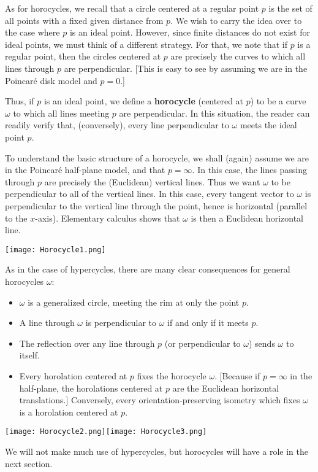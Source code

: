 \documentclass[leqno]{book}
\begin{document}
As for horocycles, we recall that a circle centered at a regular point $p$ is the set of all points with a fixed given distance from $p$.  We wish to carry the idea over to the case where $p$ is an ideal point.  However, since finite distances do not exist for ideal points, we must think of a different strategy.  For that, we note that if $p$ is a regular point, then the circles centered at $p$ are precisely the curves to which all lines through $p$ are perpendicular.  [This is easy to see by assuming we are in the Poincar\'e disk model and $p=0$.]

Thus, if $p$ is an ideal point, we define a \textbf{horocycle} (centered at $p$) to be a curve $\omega$ to which all lines meeting $p$ are perpendicular.  In this situation, the reader can readily verify that, (conversely), every line perpendicular to $\omega$ meets the ideal point $p$.

To understand the basic structure of a horocycle, we shall (again) assume we are in the Poincar\'e half-plane model, and that $p=\infty$.  In this case, the lines passing through $p$ are precisely the (Euclidean) vertical lines.  Thus we want $\omega$ to be perpendicular to all of the vertical lines.  In this case, every tangent vector to $\omega$ is perpendicular to the vertical line through the point, hence is horizontal (parallel to the $x$-axis).  Elementary calculus shows that $\omega$ is then a Euclidean horizontal line.
\begin{center}\texttt{[image: Horocycle1.png]}\end{center}
As in the case of hypercycles, there are many clear consequences for general horocycles $\omega$:
\begin{itemize}
\item $\omega$ is a generalized circle, meeting the rim at only the point $p$.

\item A line through $\omega$ is perpendicular to $\omega$ if and only if it meets $p$.

\item The reflection over any line through $p$ (or perpendicular to $\omega$) sends $\omega$ to itself.

\item Every horolation centered at $p$ fixes the horocycle $\omega$.  [Because if $p=\infty$ in the half-plane, the horolations centered at $p$ are the Euclidean horizontal translations.]  Conversely, every orientation-preserving isometry which fixes $\omega$ is a horolation centered at $p$.
\end{itemize}
\begin{center}\texttt{[image: Horocycle2.png]}\texttt{[image: Horocycle3.png]}\end{center}
We will not make much use of hypercycles, but horocycles will have a role in the next section.
\end{document}
